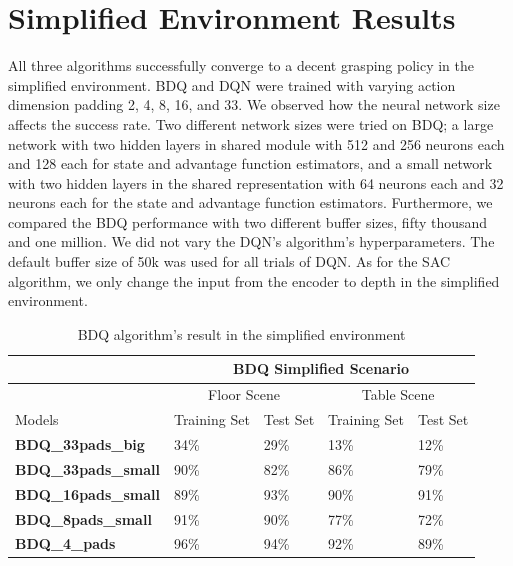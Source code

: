 \section{Simplified Environment Results}

All three algorithms successfully converge to a decent grasping policy in the simplified environment. BDQ and DQN  were trained with varying action dimension padding 2, 4, 8, 16, and 33.
We observed how the neural network size affects the success rate. Two different network sizes were tried on BDQ; a large network with two hidden layers in shared module with 512 and 256 neurons each and 128 each for state and advantage function estimators, and a small network with two hidden layers in the shared representation with 64 neurons each and 32 neurons each for the state and advantage function estimators. Furthermore, we compared the BDQ performance with two different buffer sizes, fifty thousand and one million. We did not vary the  DQN's algorithm's hyperparameters. The default buffer size of 50k was used for all trials of DQN.
As for the SAC algorithm, we only change the input from the encoder to depth in the simplified environment.

\begin{table}[!htbp]
    \begin{tabular}{|l|l|l|l|l|}
    \hline
                       & \multicolumn{4}{c|}{\textbf{BDQ Simplified Scenario}}              \\ \hline
                       & \multicolumn{2}{c|}{Floor Scene} & \multicolumn{2}{c|}{Table Scene} \\ \hline
    Models             & Training Set      & Test Set     & Training Set      & Test Set     \\ \hline
    \textbf{BDQ\_33pads\_big}   & 34\%              & 29\%         & 13\%              & 12\%         \\ \hline
    \textbf{BDQ\_33pads\_small} & 90\%              & 82\%         & 86\%              & 79\%         \\ \hline
    \textbf{BDQ\_16pads\_small} & 89\%              & 93\%         & 90\%              & 91\%         \\ \hline
    \textbf{BDQ\_8pads\_small}  & 91\%              & 90\%         & 77\%              & 72\%         \\ \hline
    \textbf{BDQ\_4\_pads}       & 96\%              & 94\%         & 92\%              & 89\%         \\ \hline
    \end{tabular}
    \caption{BDQ algorithm's result in the simplified environment}
\end{table}


